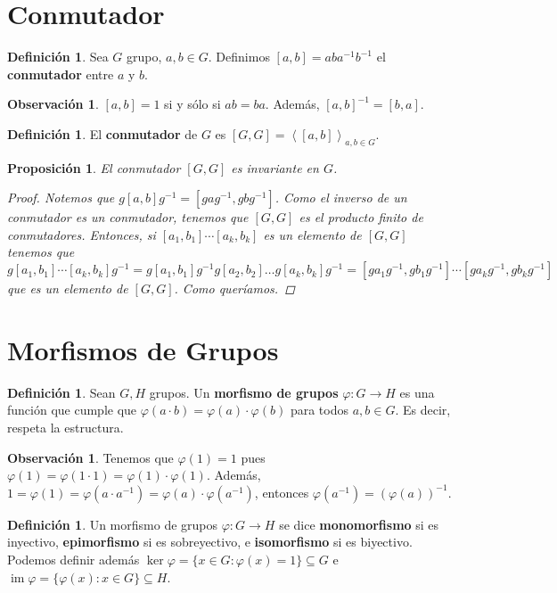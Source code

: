 \documentclass[12pt]{book}
\newtheorem{prop}[teo]{Proposición}
\theoremstyle{definition}
\newtheorem{obs}[teo]{Observación}
\newtheorem{defn}[teo]{Definición}
\DeclareMathOperator{\im}{im}
\begin{document}
\section{Conmutador}
\begin{defn} Sea $G$ grupo, $a,b\in G$. Definimos $[a,b]=aba^{-1}b^{-1}$ el \textbf{conmutador} entre $a$ y $b$.
\end{defn}
\begin{obs}
$[a,b]=1$ si y sólo si $ab=ba$. Además, $[a,b]^{-1}=[b,a]$. 
\end{obs}
\begin{defn}
El \textbf{conmutador} de $G$ es $[G,G]=\left\langle [a,b] \right\rangle_{a,b\in G}$.
\end{defn}
\begin{prop}
El conmutador $[G,G]$ es invariante en $G$.
\begin{proof}
Notemos que $g[a,b]g^{-1}=[gag^{-1},gbg^{-1}]$. Como el inverso de un conmutador es un conmutador, tenemos que $[G,G]$ es el producto finito de conmutadores. Entonces, si $[a_1,b_1]\cdots [a_k,b_k]$ es un elemento de $[G,G]$ tenemos que $$g[a_1,b_1]\cdots [a_k,b_k]g^{-1} = g[a_1,b_1]g^{-1}g[a_2,b_2]\ldots g[a_k,b_k]g^{-1} = [ga_1g^{-1},gb_1g^{-1}]\cdots [ga_kg^{-1},gb_kg^{-1}]$$ que es un elemento de $[G,G]$. Como queríamos.
\end{proof}
\end{prop}

\section{Morfismos de Grupos}

\begin{defn}
Sean $G,H$ grupos. Un \textbf{morfismo de grupos} $\varphi:G\to H$ es una función que cumple que $\varphi(a\cdot b) = \varphi(a)\cdot \varphi(b)$ para todos $a,b\in G$. Es decir, respeta la estructura.
\end{defn}

\begin{obs}
Tenemos que $\varphi(1)=1$ pues $\varphi(1) = \varphi(1\cdot 1) = \varphi(1)\cdot \varphi(1)$. Además, $1=\varphi(1) = \varphi(a\cdot a^{-1})=\varphi(a)\cdot \varphi(a^{-1})$, entonces $\varphi(a^{-1}) = (\varphi(a))^{-1}$.
\end{obs}

\begin{defn}
Un morfismo de grupos $\varphi:G\to H$ se dice \textbf{monomorfismo} si es inyectivo, \textbf{epimorfismo} si es sobreyectivo, e \textbf{isomorfismo} si es biyectivo. Podemos definir además $\ker \varphi = \{x\in G : \varphi(x)=1\}\subseteq G$ e $\im \varphi = \{\varphi(x) : x\in G\}\subseteq H$.
\end{defn}
\end{document}
